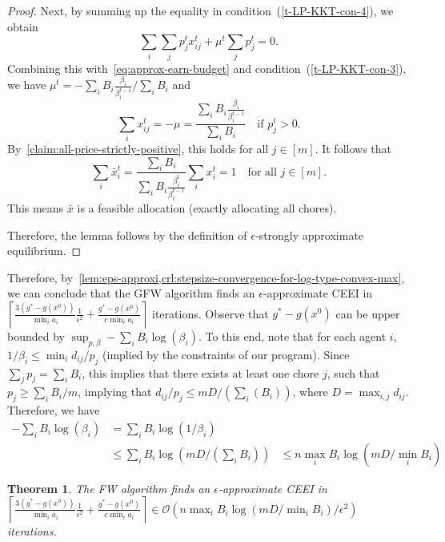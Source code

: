 \documentclass[format=acmsmall,authorversion]{acmart}
\newcommand\pcref[1]{(\cref{#1})}
\newtheorem{theorem}{Theorem}
\begin{document}
\begin{proof}
    Next, by summing up the equality in condition~\pcref{t-LP-KKT-con-4}, we obtain 
    \begin{equation}
        \sum_i \sum_j p^t_j x^t_{ij} + \mu^t \sum_j p^t_j = 0. 
    \end{equation} 
    Combining this with~\cref{eq:approx-earn-budget} and condition~\pcref{t-LP-KKT-con-3}, we have $\mu^t = - {\sum_i B_i \frac{\beta_i}{\beta^{t-1}_i}}\Big/{\sum_i B_i}$ and 
    \begin{equation}
        \sum_i x^t_{ij} = -\mu = \frac{\sum_i B_i \frac{\beta_i}{\beta^{t-1}_i}}{\sum_i B_i} \quad \text{if } p^t_j > 0. 
    \end{equation} 
    By~\cref{claim:all-price-strictly-positive}, this holds for all $j \in [m]$. 
    It follows that 
    \begin{equation}
        \sum_i \bar{x}^t_i = \frac{\sum_i B_i}{\sum_i B_i \frac{\beta^t_i}{\beta^{t-1}_i}} \sum_i x^t_i = 1 \quad \mbox{for all } j \in [m]. 
    \end{equation} 
    This means $\bar{x}$ is a feasible allocation (exactly allocating all chores).

    Therefore, the lemma follows by the definition of $\epsilon$-strongly approximate equilibrium. 
\end{proof}
Therefore, by~\cref{lem:eps-approxi,crl:stepsize-convergence-for-log-type-convex-max}, we can conclude that the GFW algorithm finds an $\epsilon$-approximate CEEI in $\left\lceil \frac{3(g^* - g(x^0))}{\min_i a_i} \frac{1}{\epsilon^2} + \frac{g^* - g(x^0)}{c \min_i a_i} \right\rceil$ iterations. Observe that $g^*-g(x^0)$ can be upper bounded by $\sup_{p, \beta} -\sum_i B_i \log(\beta_i)$. To this end, note that for each agent $i$, $1/\beta_i \leq \min_i d_{ij}/p_j$ (implied by the constraints of our program). Since $\sum_j p_j = \sum_i B_i$, this implies that there exists at least one chore $j$, such that $p_j \geq \sum_i B_i/m$, implying that $d_{ij}/p_j \leq mD/(\sum_i(B_i))$, where $D = \max_{i,j} d_{ij}$. Therefore, we have  
\begin{align*}
    -\sum_i B_i \log(\beta_i) &= \sum_iB_i \log(1/\beta_i)\\
                              &\leq \sum_i B_i \log(mD/ (\sum_iB_i))
                              &\leq n \max_i B_i \log(mD/\min_i B_i) 
\end{align*}
\begin{theorem} 
\label{thm:convergence-final}
The FW algorithm finds an $\epsilon$-approximate CEEI in $\left\lceil \frac{3(g^* - g(x^0))}{\min_i a_i} \frac{1}{\epsilon^2} + \frac{g^* - g(x^0)}{c \min_i a_i} \right\rceil \in  \mathcal{O}(n \max_i B_i \log(mD/\min_i B_i) / \epsilon^2)$ iterations.
\end{theorem} 
\end{document}
